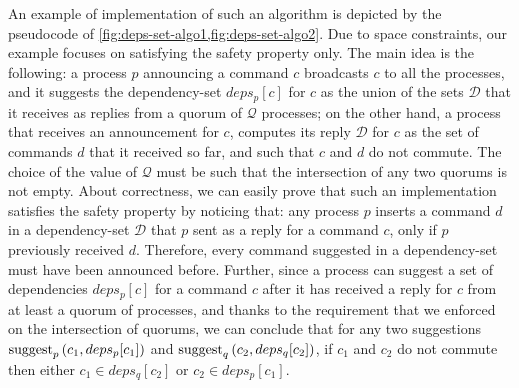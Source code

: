 An example of implementation of such an algorithm is depicted by the pseudocode of \cref{fig:deps-set-algo1,fig:deps-set-algo2}. Due to space constraints, our example focuses on satisfying the safety property only. The main idea is the following: a process $p$ announcing a command $c$ broadcasts $c$ to all the processes, and it suggests the dependency-set $deps_p[c]$ for $c$ as the union of the sets $\mathcal{D}$ that it receives as replies from a quorum of $\mathcal{Q}$ processes; on the other hand, a process that receives an announcement for $c$, computes its reply $\mathcal{D}$ for $c$ as the set of commands $d$ that it received so far, and such that $c$ and $d$ do not commute. The choice of the value of $\mathcal{Q}$ must be such that the intersection of any two quorums is not empty. About correctness, we can easily prove that such an implementation satisfies the safety property by noticing that:  any process $p$ inserts a command $d$ in a dependency-set $\mathcal{D}$ that $p$ sent as a reply for a command $c$, only if $p$ previously received $d$. Therefore, every command suggested in a dependency-set must have been announced before. Further, since a process can suggest a set of dependencies $deps_p[c]$ for a command $c$ after it has received a reply for $c$ from at least a quorum of processes, and thanks to the requirement that we enforced on the intersection of quorums, we can conclude that for any two suggestions $\operatorname{suggest}_p \left( c_1,deps_p[c_1]\right)$ and $\operatorname{suggest}_q \left( c_2,deps_q[c_2]\right)$,  if $c_1$ and $c_2$ do not commute then either $c_1\in deps_q[c_2]$ or $c_2 \in deps_p[c_1]$.


